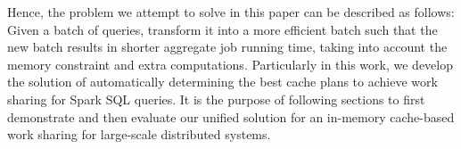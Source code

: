 Hence, the problem we attempt to solve in this paper can be described as follows: Given a batch of queries, transform it into a more efficient batch such that the new batch results in shorter aggregate job running time, taking into account the memory constraint and extra computations. Particularly in this work, we develop the solution of automatically determining the best cache plans to achieve work sharing for Spark SQL queries. It is the purpose of following sections to first demonstrate and then evaluate our unified solution for an in-memory cache-based work sharing for large-scale distributed systems.